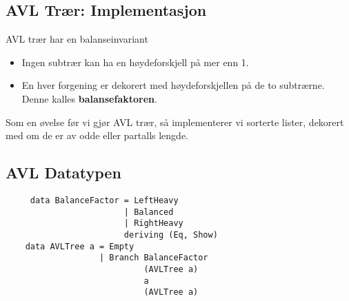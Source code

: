 \documentclass{article}
\begin{document}
    \subsection{AVL Trær: Implementasjon}
    AVL trær har en balanseinvariant
    \begin{itemize}
        \item Ingen subtrær kan ha en høydeforskjell på mer enn 1.    
        \item En hver forgening er dekorert med høydeforskjellen på de to subtrærne. Denne kalles \textbf{balansefaktoren}.
    \end{itemize}

    \begin{ex}
        Som en øvelse før vi gjør AVL trær, så implementerer vi sorterte lister, dekorert med om de er av odde eller partalls lengde.
    \end{ex}

    \newpage

    \subsection{AVL Datatypen}    
    \begin{lstlisting}
     data BalanceFactor = LeftHeavy
                        | Balanced
                        | RightHeavy
                        deriving (Eq, Show)
    data AVLTree a = Empty
                   | Branch BalanceFactor
                            (AVLTree a)
                            a
                            (AVLTree a)
    \end{lstlisting}
\end{document}
